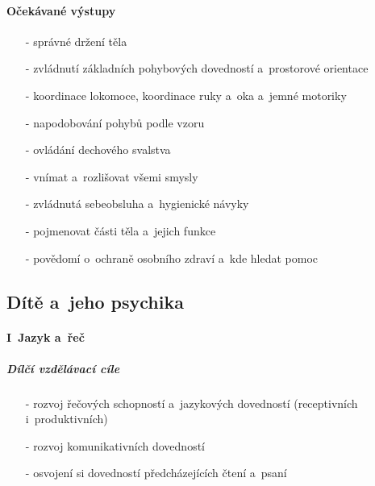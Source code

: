 				\paragraph{Očekávané výstupy}

				\begin{itemize}
				\setlength\itemsep{-2mm}
					\item[-]správné držení těla
					\item[-]zvládnutí základních pohybových dovedností a~prostorové orientace
					\item[-]koordinace lokomoce, koordinace ruky a~oka a~jemné motoriky
					\item[-]napodobování pohybů podle vzoru
					\item[-]ovládání dechového svalstva
					\item[-]vnímat a~rozlišovat všemi smysly
					\item[-]zvládnutá sebeobsluha a~hygienické návyky
					\item[-]pojmenovat části těla a~jejich funkce
					\item[-]povědomí o~ochraně osobního zdraví a~kde hledat pomoc
				\end{itemize}

			\subsection{Dítě a~jeho psychika}
				\textit{} \citep[s.~18]{RVP}
				\paragraph{I~Jazyk a~řeč}
				 
					\subparagraph{Dílčí vzdělávací cíle}

					\begin{itemize}
					\setlength\itemsep{-2mm}
						\item[-]rozvoj řečových schopností a~jazykových dovedností  (receptivních i~produktivních)
						\item[-]rozvoj komunikativních dovedností
						\item[-]osvojení si dovedností předcházejících čtení a~psaní
					\end{itemize}
					
